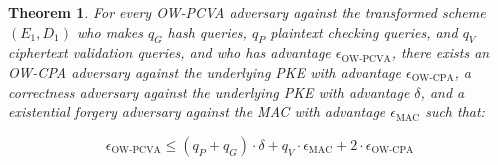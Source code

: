 \documentclass{article}
\newtheorem{theorem}{Theorem}[section]
\begin{document}
\begin{theorem}\label{thm:if-ow-cpa-then-ow-pcva}
    For every OW-PCVA adversary against the transformed scheme $(E_1, D_1)$ who makes $q_G$ hash queries, $q_P$ plaintext checking queries, and $q_V$ ciphertext validation queries, and who has advantage $\epsilon_\text{OW-PCVA}$, there exists an OW-CPA adversary against the underlying PKE with advantage $\epsilon_\text{OW-CPA}$, a correctness adversary against the underlying PKE with advantage $\delta$, and a existential forgery adversary against the MAC with advantage $\epsilon_\text{MAC}$ such that:

    \begin{equation*}
        \epsilon_\text{OW-PCVA} 
        \leq (q_P + q_G) \cdot \delta
        + q_V \cdot \epsilon_\text{MAC}
        + 2 \cdot \epsilon_\text{OW-CPA}
    \end{equation*}
\end{theorem}
\end{document}
